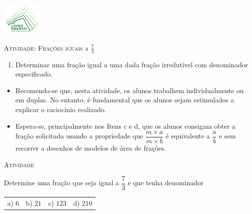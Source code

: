 \documentclass[10 pt,usenames,dvipsnames, oneside]{article}
\begin{document}
\begin{center}
  \begin{minipage}[l]{3cm}
\includegraphics[width=2cm]{../../../Figuras/logo}       
\end{minipage}\hfill
\begin{minipage}[r]{.8\textwidth}
 {\Large \scshape Atividade: Frações iguais a $\frac{7}{3}$}  
\end{minipage}
\end{center}
\vspace{.2cm}

\ifdefined\prof
\begin{goals}
\begin{enumerate}
\item       Determinar uma fração igual a uma dada fração irredutível com
denominador especificado.
\end{enumerate}

\tcblower

\begin{itemize}
\item       Recomenda-se que, nesta atividade, os alunos trabalhem
individualmente ou em duplas. No entanto, é fundamental que os alunos sejam
estimulados a explicar o raciocínio realizado.
\item       Espera-se, principalmente nos Itens c e d, que os alunos
consigam obter a fração solicitada usando a propriedade que       $\dfrac{m
\times a}{m \times b}$       é equivalente a       $\dfrac{a}{b}$       e sem
recorrer a desenhos de modelos de área de frações. 
\end{itemize}
\end{goals}

\bigskip
\begin{center}
{\large \scshape Atividade}
\end{center}
\fi

Determine uma fração que seja igual a $\dfrac{7}{3}$ e que tenha denominador

\begin{tabular}{m{}m{}m{}m{}}
 a) $6$ & b) $21$ & c) $123$ & d) $210$
\end{tabular}
\end{document}
